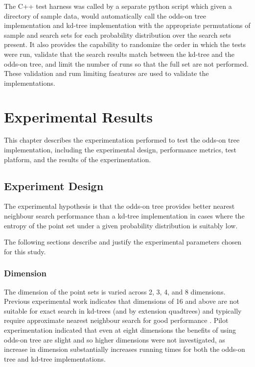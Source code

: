 \documentclass[mcs]{scsthesis}
\begin{document}
The C++ test harness was called by a separate python script which given a
directory of sample data, would automatically call the odds-on tree
implementation and kd-tree implementation with the appropriate permutations of
sample and search sets for each probability distribution over the search sets
present. It also provides the capability to randomize the order in which the
tests were run, validate that the search results match between the kd-tree and
the odds-on tree, and limit the number of runs so that the full set are not
performed. These validation and rum limiting faeatures are used to validate the
implementations.

\chapter{Experimental Results}

This chapter describes the experimentation performed to test the odds-on tree
implementation, including the experimental design, performance metrics, test
platform, and the results of the experimentation.

\section{Experiment Design}

The experimental hypothesis is that the odds-on tree provides better nearest
neighbour search performance than a kd-tree implementation in cases where the
entropy of the point set under a given probability distribution is suitably low.

The following sections describe and justify the experimental parameters chosen
for this study.

\subsection{Dimension}

The dimension of the point sets is varied across 2, 3, 4, and 8 dimensions.
Previous experimental work indicates that dimensions of 16 and above are not
suitable for exact search in kd-trees (and by extension quadtrees) and typically 
require approximate nearest neighbour search for good performance \cite{app-ann}.
Pilot experimentation indicated that even at eight dimensions the benefits of
using odds-on tree are slight and so higher dimensions were not investigated, as
increase in dimension substantially increases running times for both the
odds-on tree and kd-tree implementations.
\end{document}
